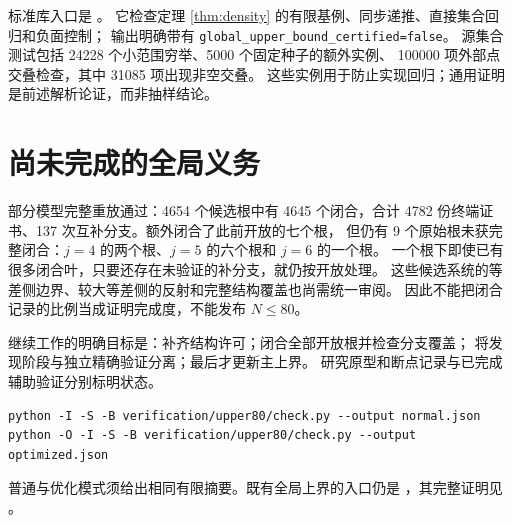 \documentclass[10pt,a4paper]{article}
\begin{document}
标准库入口是 。
它检查定理 \ref{thm:density} 的有限基例、同步递推、直接集合回归和负面控制；
输出明确带有 \texttt{global\_upper\_bound\_certified=false}。
源集合测试包括 24228 个小范围穷举、5000 个固定种子的额外实例、
100000 项外部点交叠检查，其中 31085 项出现非空交叠。
这些实例用于防止实现回归；通用证明是前述解析论证，而非抽样结论。

\section{尚未完成的全局义务}
部分模型完整重放通过：4654 个候选根中有 4645 个闭合，合计 4782 份终端证书、137 次互补分支。额外闭合了此前开放的七个根，
但仍有 9 个原始根未获完整闭合：$j=4$ 的两个根、$j=5$ 的六个根和 $j=6$ 的一个根。
一个根下即使已有很多闭合叶，只要还存在未验证的补分支，就仍按开放处理。
这些候选系统的等差侧边界、较大等差侧的反射和完整结构覆盖也尚需统一审阅。
因此不能把闭合记录的比例当成证明完成度，不能发布 $N\le80$。

继续工作的明确目标是：补齐结构许可；闭合全部开放根并检查分支覆盖；
将发现阶段与独立精确验证分离；最后才更新主上界。
研究原型和断点记录与已完成辅助验证分别标明状态。

\begin{verbatim}
python -I -S -B verification/upper80/check.py --output normal.json
python -O -I -S -B verification/upper80/check.py --output optimized.json
\end{verbatim}
普通与优化模式须给出相同有限摘要。既有全局上界的入口仍是
，其完整证明见
。
\end{document}
